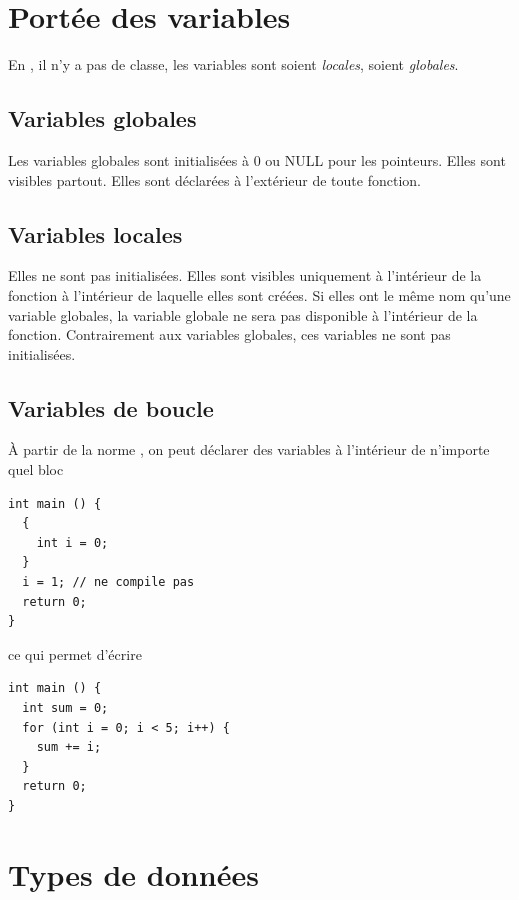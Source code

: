 \section{Portée des variables}
En \clang{}, il n'y a pas de classe,
les variables sont soient \emph{locales}, soient \emph{globales}.

\subsection{Variables globales}
Les variables globales sont initialisées à 0 ou NULL pour les pointeurs.
Elles sont visibles partout.
Elles sont déclarées à l'extérieur de toute fonction.

\subsection{Variables locales}
Elles ne sont pas initialisées.
Elles sont visibles uniquement à l'intérieur de la fonction à l'intérieur
de laquelle elles sont créées.
Si elles ont le même nom qu'une variable globales,
la variable globale ne sera pas disponible à l'intérieur de la fonction.
Contrairement aux variables globales, ces variables ne sont pas
initialisées.

\subsection{Variables de boucle}
À partir de la norme ,
on peut déclarer des variables à l'intérieur
de n'importe quel bloc
\begin{lstlisting}
int main () {
  {
    int i = 0;
  }
  i = 1; // ne compile pas
  return 0;
}
\end{lstlisting}
ce qui permet d'écrire
\begin{lstlisting}
int main () {
  int sum = 0;
  for (int i = 0; i < 5; i++) {
    sum += i;
  }
  return 0;
}
\end{lstlisting}





\section{Types de données}
